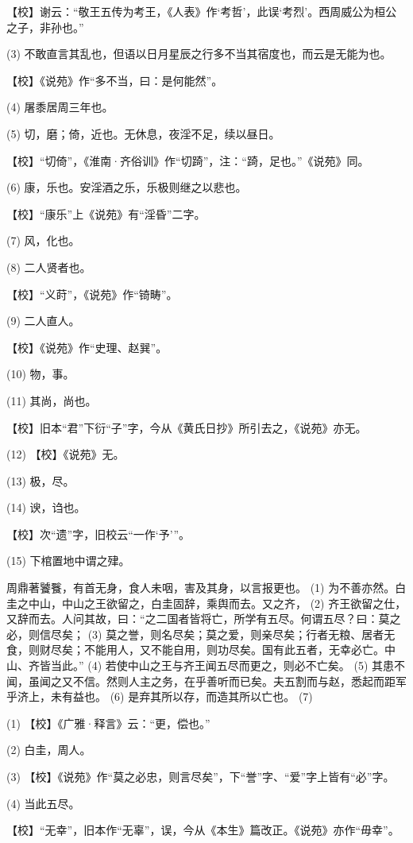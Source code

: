 \documentclass[12pt,UTF8]{ctexbook}
\begin{document}
【校】谢云：“敬王五传为考王，《人表》作‘考哲’，此误‘考烈’。西周威公为桓公之子，非孙也。”

(3) 不敢直言其乱也，但语以日月星辰之行多不当其宿度也，而云是无能为也。

【校】《说苑》作“多不当，曰：是何能然”。

(4) 屠黍居周三年也。

(5) 切，磨；倚，近也。无休息，夜淫不足，续以昼日。

【校】“切倚”，《淮南·齐俗训》作“切踦”，注：“踦，足也。”《说苑》同。

(6) 康，乐也。安淫酒之乐，乐极则继之以悲也。

【校】“康乐”上《说苑》有“淫昏”二字。

(7) 风，化也。

(8) 二人贤者也。

【校】“义莳”，《说苑》作“锜畴”。

(9) 二人直人。

【校】《说苑》作“史理、赵巽”。

(10) 物，事。

(11) 其尚，尚也。

【校】旧本“君”下衍“子”字，今从《黄氏日抄》所引去之，《说苑》亦无。

(12) 【校】《说苑》无。

(13) 极，尽。

(14) 谀，诌也。

【校】次“遗”字，旧校云“一作‘予’”。

(15) 下棺置地中谓之肂。

周鼎著饕餮，有首无身，食人未咽，害及其身，以言报更也。 (1) 为不善亦然。白圭之中山，中山之王欲留之，白圭固辞，乘舆而去。又之齐， (2) 齐王欲留之仕，又辞而去。人问其故，曰：“之二国者皆将亡，所学有五尽。何谓五尽？曰：莫之必，则信尽矣； (3) 莫之誉，则名尽矣；莫之爱，则亲尽矣；行者无粮、居者无食，则财尽矣；不能用人，又不能自用，则功尽矣。国有此五者，无幸必亡。中山、齐皆当此。” (4) 若使中山之王与齐王闻五尽而更之，则必不亡矣。 (5) 其患不闻，虽闻之又不信。然则人主之务，在乎善听而已矣。夫五割而与赵，悉起而距军乎济上，未有益也。 (6) 是弃其所以存，而造其所以亡也。 (7)

(1) 【校】《广雅·释言》云：“更，偿也。”

(2) 白圭，周人。

(3) 【校】《说苑》作“莫之必忠，则言尽矣”，下“誉”字、“爱”字上皆有“必”字。

(4) 当此五尽。

【校】“无幸”，旧本作“无辜”，误，今从《本生》篇改正。《说苑》亦作“毋幸”。
\end{document}
